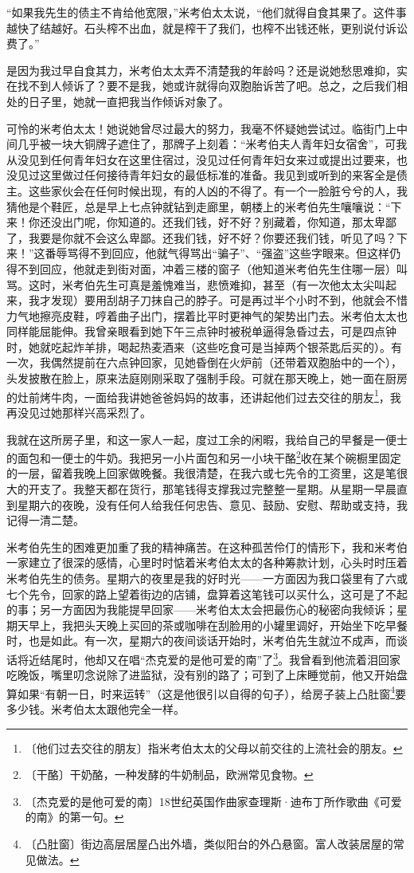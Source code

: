 \documentclass[12pt,UTF-8,openany]{ctexbook}
\begin{document}
\begin{large}
    “如果我先生的债主不肯给他宽限，”米考伯太太说，“他们就得自食其果了。这件事越快了结越好。石头榨不出血，就是榨干了我们，也榨不出钱还帐，更别说付诉讼费了。”
    
    是因为我过早自食其力，米考伯太太弄不清楚我的年龄吗？还是说她愁思难抑，实在找不到人倾诉了？要不是我，她或许就得向双胞胎诉苦了吧。总之，之后我们相处的日子里，她就一直把我当作倾诉对象了。
    
    可怜的米考伯太太！她说她曾尽过最大的努力，我毫不怀疑她尝试过。临街门上中间几乎被一块大铜牌子遮住了，那牌子上刻着：“米考伯夫人青年妇女宿舍”，可我从没见到任何青年妇女在这里住宿过，没见过任何青年妇女来过或提出过要来，也没见过这里做过任何接待青年妇女的最低标准的准备。我见到或听到的来客全是债主。这些家伙会在任何时候出现，有的人凶的不得了。有一个一脸脏兮兮的人，我猜他是个鞋匠，总是早上七点钟就钻到走廊里，朝楼上的米考伯先生嚷嚷说：“下来！你还没出门呢，你知道的。还我们钱，好不好？别藏着，你知道，那太卑鄙了，我要是你就不会这么卑鄙。还我们钱，好不好？你要还我们钱，听见了吗？下来！”这番辱骂得不到回应，他就气得骂出“骗子”、“强盗”这些字眼来。但这样仍得不到回应，他就走到街对面，冲着三楼的窗子（他知道米考伯先生住哪一层）叫骂。这时，米考伯先生可真是羞愧难当，悲愤难抑，甚至（有一次他太太尖叫起来，我才发现）要用刮胡子刀抹自己的脖子。可是再过半个小时不到，他就会不惜力气地擦亮皮鞋，哼着曲子出门，摆着比平时更神气的架势出门去。米考伯太太也同样能屈能伸。我曾亲眼看到她下午三点钟时被税单逼得急昏过去，可是四点钟时，她就吃起炸羊排，喝起热麦酒来（这些吃食可是当掉两个银茶匙后买的）。有一次，我偶然提前在六点钟回家，见她昏倒在火炉前（还带着双胞胎中的一个），头发披散在脸上，原来法庭刚刚采取了强制手段。可就在那天晚上，她一面在厨房的灶前烤牛肉，一面给我讲她爸爸妈妈的故事，还讲起他们过去交往的朋友\footnote{〔他们过去交往的朋友〕指米考伯太太的父母以前交往的上流社会的朋友。}，我再没见过她那样兴高采烈了。
    
    我就在这所房子里，和这一家人一起，度过工余的闲暇，我给自己的早餐是一便士的面包和一便士的牛奶。我把另一小片面包和另一小块干酪\footnote{〔干酪〕干奶酪，一种发酵的牛奶制品，欧洲常见食物。}收在某个碗橱里固定的一层，留着我晚上回家做晚餐。我很清楚，在我六或七先令的工资里，这是笔很大的开支了。我整天都在货行，那笔钱得支撑我过完整整一星期。从星期一早晨直到星期六的夜晚，没有任何人给我任何忠告、意见、鼓励、安慰、帮助或支持，我记得一清二楚。
    
    米考伯先生的困难更加重了我的精神痛苦。在这种孤苦伶仃的情形下，我和米考伯一家建立了很深的感情，心里时时惦着米考伯太太的各种筹款计划，心头时时压着米考伯先生的债务。星期六的夜里是我的好时光——一方面因为我口袋里有了六或七个先令，回家的路上望着街边的店铺，盘算着这笔钱可以买什么，这可是了不起的事；另一方面因为我能提早回家——米考伯太太会把最伤心的秘密向我倾诉；星期天早上，我把头天晚上买回的茶或咖啡在刮脸用的小罐里调好，开始坐下吃早餐时，也是如此。有一次，星期六的夜间谈话开始时，米考伯先生就泣不成声，而谈话将近结尾时，他却又在唱“杰克爱的是他可爱的南”了\footnote{〔杰克爱的是他可爱的南〕18世纪英国作曲家查理斯·迪布丁所作歌曲《可爱的南》的第一句。}。我曾看到他流着泪回家吃晚饭，嘴里叨念说除了进监狱，没有别的路了；可到了上床睡觉前，他又开始盘算如果“有朝一日，时来运转”（这是他很引以自得的句子），给房子装上凸肚窗\footnote{〔凸肚窗〕街边高层居屋凸出外墙，类似阳台的外凸悬窗。富人改装居屋的常见做法。}要多少钱。米考伯太太跟他完全一样。
    

\end{large}
\end{document}
